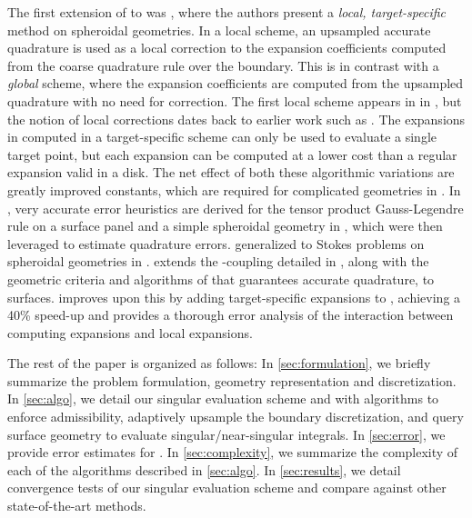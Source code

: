The first extension of \qbx to \threed  was \cite{ST}, where the authors present a \textit{local, target-specific } \qbx method on spheroidal geometries.
In a local \qbx scheme, an upsampled accurate quadrature is used as a local correction to the expansion coefficients computed from the coarse quadrature rule over the boundary.
This is in contrast with a \textit{global} scheme, where the expansion coefficients are computed from the upsampled quadrature with no need for correction.
The first local \qbx scheme appears in \cite{barnett2014evaluation} in \twod, but the notion of local \fmm corrections dates back to earlier work such as \cite{alpert1999hybrid, kapur1997high}.
The expansions in \cite{ST} computed in a target-specific \qbx scheme can only be used to evaluate a single target point, but each expansion can be computed at a lower cost than a regular expansion valid in a disk.
The net effect of both these algorithmic variations are greatly improved constants, which are required for complicated geometries in \threed.
In \cite{aT2}, very accurate error heuristics are derived for the tensor product Gauss-Legendre rule on a surface panel and a simple spheroidal geometry in \threed, which were then leveraged to estimate \qbx quadrature errors.
\cite{af2016fast} generalized \qbx to Stokes problems on spheroidal geometries in \threed.
\cite{wala20193d} extends the \qbx-\fmm coupling detailed in \cite{wala2018fast}, along with the geometric criteria and algorithms of \cite{RKO} that guarantees accurate quadrature, to \threed surfaces. 
\cite{wala2019optimization} improves upon this by adding target-specific expansions to \cite{wala20193d}, achieving a 40\% speed-up and \cite{wala2020approximation} provides a thorough error analysis of the interaction between computing \qbx expansions and \fmm local expansions.


The rest of the paper is organized as follows: 
In \cref{sec:formulation}, we briefly summarize the problem formulation, geometry representation and discretization.
In \cref{sec:algo}, we detail our singular evaluation scheme and with algorithms to enforce admissibility, adaptively upsample the boundary discretization, and query surface geometry to evaluate singular/near-singular integrals.
In \cref{sec:error}, we provide error estimates for \qbkix. %
In \cref{sec:complexity}, we summarize the complexity of each of the algorithms described in \cref{sec:algo}.
In \cref{sec:results}, we detail convergence tests of our singular evaluation scheme and compare against other state-of-the-art methods.
